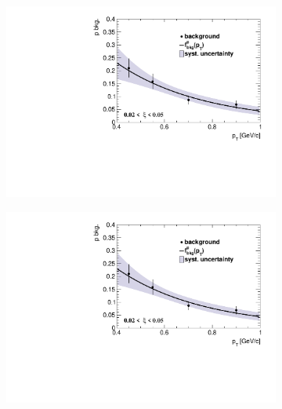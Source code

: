 \begin{figure}[t!]
	\centering
	\begin{subfigure}{.49\textwidth}
		\includegraphics[width=\textwidth,page=1]{chapters/chrgSTAR/img/DCAproton/p_bkg_summary.pdf}
	\end{subfigure}%
	\begin{subfigure}{.49\textwidth}
		\includegraphics[width=\textwidth,page=2]{chapters/chrgSTAR/img/DCAproton/p_bkg_summary.pdf}
	\end{subfigure}
	\begin{subfigure}{.49\textwidth}

\end{subfigure}
\end{figure}
